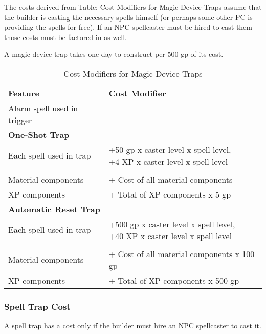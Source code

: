 The costs derived from Table: Cost Modifiers for Magic Device Traps assume that 
the builder is casting the necessary spells himself (or perhaps some other PC is 
providing the spells for free). If an NPC spellcaster must be hired to cast them 
those costs must be factored in as well.

A magic device trap takes one day to construct per 500 gp of its cost.

\begin{table}[htb]
\caption{Cost Modifiers for Magic Device Traps}
\centering
\begin{tabular}{l l}
\textbf{Feature} & \textbf{Cost Modifier}\\
Alarm spell used in trigger & -\\
\textbf{One-Shot Trap}&\\
\hspace{.2cm}Each spell used in trap &\shortstack{+50 gp x caster level x spell level,\\+4 XP x caster level x spell level}\\
&\\
\hspace{.2cm}Material components &+ Cost of all material components\\
\hspace{.2cm}XP components &+ Total of XP components x 5 gp\\
\textbf{Automatic Reset Trap}&\\
\hspace{.2cm}Each spell used in trap &\shortstack{+500 gp x caster level x spell level,\\+40 XP x caster level x spell level}\\
&\\
\hspace{.2cm}Material components &+ Cost of all material components x 100 gp\\
\hspace{.2cm}XP components &+ Total of XP components x 500 gp\\
\end{tabular}
\end{table}

\subsubsection{Spell Trap Cost}

A spell trap has a cost only if the builder must hire an NPC spellcaster to cast 
it.

